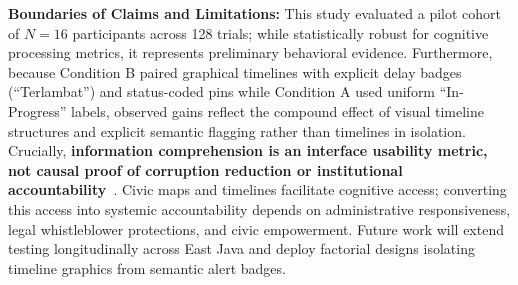 \documentclass[runningheads]{llncs}
\newcommand{\hl}[1]{#1}
\begin{document}
\noindent\textbf{Boundaries of Claims and Limitations:} This study evaluated a pilot cohort of $N = 16$ participants across 128 trials; while statistically robust for cognitive processing metrics, it represents preliminary behavioral evidence. \hl{Furthermore, because Condition B paired graphical timelines with explicit delay badges (``Terlambat'') and status-coded pins while Condition A used uniform ``In-Progress'' labels, observed gains reflect the compound effect of visual timeline structures and explicit semantic flagging rather than timelines in isolation.} Crucially, \textbf{information comprehension is an interface usability metric, not causal proof of corruption reduction or institutional accountability}~\cite{ambituuni2025infrastructure,saelawong2024transparency}. Civic maps and timelines facilitate cognitive access; converting this access into systemic accountability depends on administrative responsiveness, legal whistleblower protections, and civic empowerment. \hl{Future work will extend testing longitudinally across East Java and deploy factorial designs isolating timeline graphics from semantic alert badges.}



%
%
\renewcommand{\doi}[1]{\href{https://doi.org/#1}{\nolinkurl{doi:#1}}}



\end{document}
